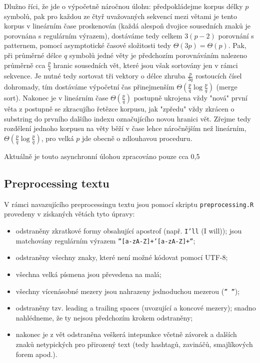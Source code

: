 Dlužno říci, že jde o výpočetně náročnou úlohu: předpokládejme korpus délky $p$ symbolů, pak pro každou ze čtyř uvažovaných sekvencí mezi větami je tento korpus v lineárním čase proskenován (každá alespoň dvojice sousedních znaků je porovnána s regulárním výrazem), dostáváme tedy celkem $3(p-2)$ porovnání s patternem, pomocí asymptotické časové složitosti tedy $\Theta(3p) = \Theta(p)$. Pak, při průměrné délce $q$ symbolů jedné věty je předchozím porovnáváním nalezeno průměrně cca $\frac{p}{q}$ hranic sousedních vět, které jsou však sortovány jen v rámci sekvence. Je nutné tedy sortovat tři vektory o délce zhruba $\frac{p}{3q}$ rostoucích čísel dohromady, tím dostáváme výpočetní čas přinejmenším $\Theta(\frac{p}{q} \log \frac{p}{q})$ (merge sort). Nakonec je v lineárním čase $\Theta(\frac{p}{q})$ postupně ukrojena vždy "nová" první věta z postupně se zkracujího řetězce korpusu, jak "zpředu" vždy zkrácen o substring do prvního dalšího indexu označujícího novou hranici vět. Zřejme tedy rozdělení jednoho korpusu na věty běží v čase lehce náročnějším než lineárním, $\Theta(\frac{p}{q} \log \frac{p}{q})$, pro velká $p$ jde obecně o zdlouhavou proceduru.

Aktuálně je touto asynchronní úlohou zpracováno pouze cca 0,5 %



\subsection{Preprocessing textu}

V rámci navazujícího preprocessingu textu jsou pomocí skriptu \texttt{preprocessing.R} provedeny v získaných větách tyto úpravy:

\begin{itemize}
  \item odstraněny zkratkové formy obsahující apostrof (např. \texttt{I'll} (I will)); jsou matchovány regulárním výrazem \texttt{''[a-zA-Z]+'[a-zA-Z]+''};
  \item odstraněny všechny znaky, které není možné kódovat pomocí UTF-8;
  \item všechna velká písmena jsou převedena na malá;
  \item všechny vícenásobné mezery jsou nahrazeny jednoduchou mezerou (\texttt{'' ''});
  \item odstraněny tzv. leading a trailing spaces (uvozující a koncové mezery); snadno nahlédneme, že ty nejsou předchozím krokem odstraněny;
  \item nakonec je z vět odstraněna veškerá intepunkce včetně závorek a dalších znaků netypických pro přirozený text (tedy hashtagů, zavináčů, smajlíkových forem apod.).
\end{itemize}



